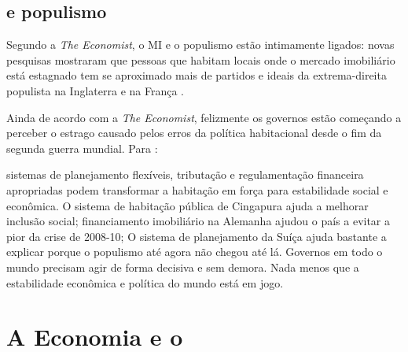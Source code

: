 \documentclass[
	12pt,				%
	oneside,			%
	a4paper,			%
	chapter=TITLE,		%
	section=TITLE,		%
	english,			%
	brazil				%
	]{abntex2}
\begin{document}
\begin{refsection}
{\subsection{\texorpdfstring{ e populismo}{ e populismo}}\label{e-populismo}}

Segundo a \emph{The Economist}, o \gls{MI} e o populismo estão intimamente
ligados: novas pesquisas mostraram que pessoas que habitam locais onde o mercado
imobiliário está estagnado tem se aproximado mais de partidos e ideais da
extrema-direita populista na Inglaterra e na França \autocite{economist-housing-2020}.

Ainda de acordo com a \emph{The Economist}, felizmente os governos estão começando a
perceber o estrago causado pelos erros da política habitacional desde o fim da
segunda guerra mundial. Para \textcite{economist-housing-2020}:
\begin{citacao}
sistemas de planejamento flexíveis, tributação e regulamentação financeira
apropriadas podem transformar a habitação em força para estabilidade social e
econômica. O sistema de habitação pública de Cingapura ajuda a melhorar inclusão
social; financiamento imobiliário na Alemanha ajudou o país a evitar a pior da
crise de 2008-10; O sistema de planejamento da Suíça ajuda bastante a explicar
porque o populismo até agora não chegou até lá. Governos em todo o mundo
precisam agir de forma decisiva e sem demora. Nada menos que a estabilidade 
econômica e política do mundo está em jogo.
\cite{economist-housing-2020}
\end{citacao}
\hypertarget{a-economia-e-o}{%
\section{\texorpdfstring{A Economia e o }{A Economia e o }}\label{a-economia-e-o}}


\end{refsection}
\end{document}
